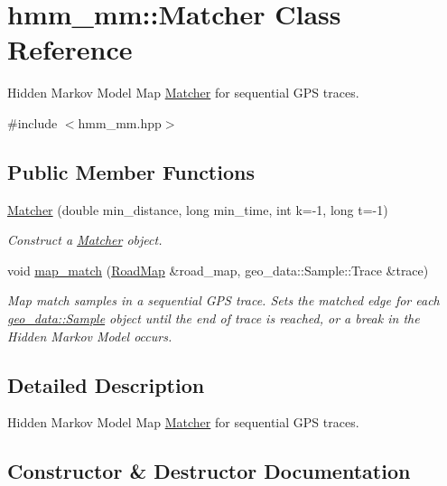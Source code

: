 \hypertarget{classhmm__mm_1_1Matcher}{}\section{hmm\+\_\+mm\+:\+:Matcher Class Reference}
\label{classhmm__mm_1_1Matcher}


Hidden Markov Model Map \hyperlink{classhmm__mm_1_1Matcher}{Matcher} for sequential G\+PS traces.  




{\ttfamily \#include $<$hmm\+\_\+mm.\+hpp$>$}

\subsection*{Public Member Functions}
\begin{DoxyCompactItemize}
\item 
\hyperlink{classhmm__mm_1_1Matcher_a4a1a9eafcddc6c98789e056121f55ee1}{Matcher} (double min\+\_\+distance, long min\+\_\+time, int k=-\/1, long t=-\/1)
\begin{DoxyCompactList}\small\item\em Construct a \hyperlink{classhmm__mm_1_1Matcher}{Matcher} object. \end{DoxyCompactList}\item 
void \hyperlink{classhmm__mm_1_1Matcher_ab6ead19f86c9ed2711d0b6e4cc20365a}{map\+\_\+match} (\hyperlink{classhmm__mm_1_1RoadMap}{Road\+Map} \&road\+\_\+map, geo\+\_\+data\+::\+Sample\+::\+Trace \&trace)
\begin{DoxyCompactList}\small\item\em Map match samples in a sequential G\+PS trace. Sets the matched edge for each \hyperlink{classgeo__data_1_1Sample}{geo\+\_\+data\+::\+Sample} object until the end of trace is reached, or a break in the Hidden Markov Model occurs. \end{DoxyCompactList}\end{DoxyCompactItemize}


\subsection{Detailed Description}
Hidden Markov Model Map \hyperlink{classhmm__mm_1_1Matcher}{Matcher} for sequential G\+PS traces. 

\subsection{Constructor \& Destructor Documentation}
